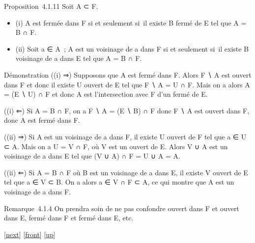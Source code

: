 \documentclass[]{article}
\begin{document}
Proposition~4.1.11 Soit A ⊂ F.

\begin{itemize}
\itemsep1pt\parskip0pt
\item
  (i) A est fermée dans F si et seulement si~il existe B fermé de E tel
  que A = B ∩ F.
\item
  (ii) Soit a ∈ A~; A est un voisinage de a dans F si et seulement si~il
  existe B voisinage de a dans E tel que A = B ∩ F.
\end{itemize}

Démonstration ((i) ⇒) Supposons que A est fermé dans F. Alors F ∖ A est
ouvert dans F et donc il existe U ouvert de E tel que F ∖ A = U ∩ F.
Mais on a alors A = (E ∖ U) ∩ F et donc A est l'intersection avec F d'un
fermé de E.

((i) ⇐) Si A = B ∩ F, on a F ∖ A = (E ∖ B) ∩ F donc F ∖ A est ouvert
dans F, donc A est fermé dans F.

((ii) ⇒) Si A est un voisinage de a dans F, il existe U ouvert de F tel
que a ∈ U ⊂ A. Mais on a U = V ∩ F, où V est un ouvert de E. Alors V ∪ A
est un voisinage de a dans E tel que (V ∪ A) ∩ F = U ∪ A = A.

((ii) ⇐) Si A = B ∩ F où B est un voisinage de a dans E, il existe V
ouvert de E tel que a ∈ V ⊂ B. On a alors a ∈ V ∩ F ⊂ A, ce qui montre
que A est un voisinage de a dans F.

Remarque~4.1.4 On prendra soin de ne pas confondre ouvert dans F et
ouvert dans E, fermé dans F et fermé dans E, etc.

{[}\href{coursse19.html}{next}{]} {[}\href{coursse18.html}{front}{]}
{[}\href{coursch5.html\#coursse18.html}{up}{]}
\end{document}

